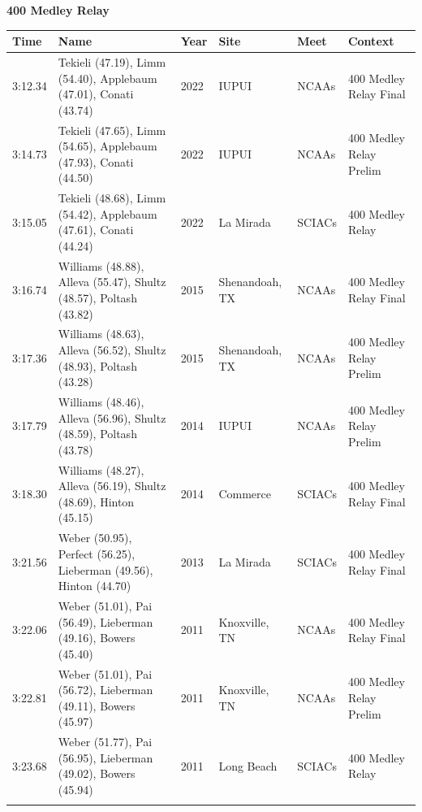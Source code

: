 \vspace{1.2em}
\noindent\begin{minipage}[t]{0.98\textwidth}
\centering
\textbf{\textcolor{teamprimary}{400 Medley Relay}}\par
\vspace{0.5em}
\centering
\small
\renewcommand{\arraystretch}{1.0}
\setlength{\tabcolsep}{4pt}
\begin{tabular}{@{}p{2.0cm}p{3.2cm}p{1.2cm}p{2.0cm}p{2.0cm}p{2.5cm}@{}}
\toprule
\textbf{Time} & \textbf{Name} & \textbf{Year} & \textbf{Site} & \textbf{Meet} & \textbf{Context} \\
\midrule
3:12.34 & Tekieli (47.19), Limm (54.40), Applebaum (47.01), Conati (43.74) & 2022 & IUPUI & NCAAs & 400 Medley Relay Final \\
3:14.73 & Tekieli (47.65), Limm (54.65), Applebaum (47.93), Conati (44.50) & 2022 & IUPUI & NCAAs & 400 Medley Relay Prelim \\
3:15.05 & Tekieli (48.68), Limm (54.42), Applebaum (47.61), Conati (44.24) & 2022 & La Mirada & SCIACs & 400 Medley Relay \\
3:16.74 & Williams (48.88), Alleva (55.47), Shultz (48.57), Poltash (43.82) & 2015 & Shenandoah, TX & NCAAs & 400 Medley Relay Final \\
3:17.36 & Williams (48.63), Alleva (56.52), Shultz (48.93), Poltash (43.28) & 2015 & Shenandoah, TX & NCAAs & 400 Medley Relay Prelim \\
3:17.79 & Williams (48.46), Alleva (56.96), Shultz (48.59), Poltash (43.78) & 2014 & IUPUI & NCAAs & 400 Medley Relay Prelim \\
3:18.30 & Williams (48.27), Alleva (56.19), Shultz (48.69), Hinton (45.15) & 2014 & Commerce & SCIACs & 400 Medley Relay Final \\
3:21.56 & Weber (50.95), Perfect (56.25), Lieberman (49.56), Hinton (44.70) & 2013 & La Mirada & SCIACs & 400 Medley Relay Final \\
3:22.06 & Weber (51.01), Pai (56.49), Lieberman (49.16), Bowers (45.40) & 2011 & Knoxville, TN & NCAAs & 400 Medley Relay Final \\
3:22.81 & Weber (51.01), Pai (56.72), Lieberman (49.11), Bowers (45.97) & 2011 & Knoxville, TN & NCAAs & 400 Medley Relay Prelim \\
3:23.68 & Weber (51.77), Pai (56.95), Lieberman (49.02), Bowers (45.94) & 2011 & Long Beach & SCIACs & 400 Medley Relay \\
\bottomrule
\vspace{0.5em}
\end{tabular}
\end{minipage}